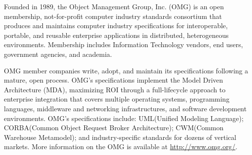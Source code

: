 \documentclass[10pt, a4paper]{isov2}
\begin{document}
\renewcommand{\contentsname}{Table of Contents}
\tableofcontents


\cleardoublepage
{}




Founded in 1989, the Object Management Group, Inc. (OMG) is an open membership, not-for-profit 
computer industry standards consortium that produces and maintains computer industry specifications 
for interoperable, portable, and reusable enterprise applications in distributed, heterogeneous 
environments. Membership includes Information Technology vendors, end users, government agencies, 
 and academia. 
 
OMG member companies write, adopt, and maintain its specifications following a mature, open 
 process. OMG's specifications implement the Model Driven Architecture\textregistered \xspace 
 (MDA\textregistered\xspace), maximizing ROI 
  through a full-lifecycle approach to enterprise integration that covers multiple operating 
   systems, programming languages, middleware and networking infrastructures, and software 
    development environments. OMG's specifications include: UML\textregistered\xspace (Unified Modeling Language\texttrademark\xspace); 
	 CORBA\textregistered\xspace (Common Object Request Broker Architecture); CWM\texttrademark\xspace (Common Warehouse Metamodel); and 
	  industry-specific standards for dozens of vertical markets. 
More information on the OMG is available at \url{http://www.omg.org/}.


\end{document}
